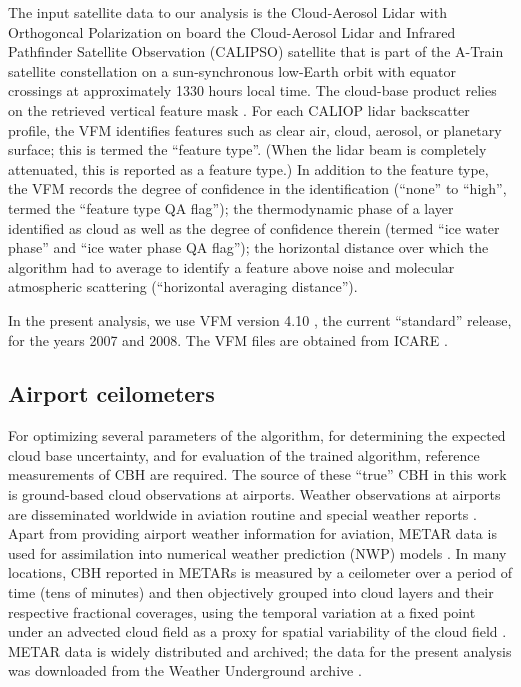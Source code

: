 \documentclass[essd,manuscript]{copernicus}\usepackage[]{graphicx}\usepackage[]{color}
\newcommand{\hlnum}[1]{\textcolor[rgb]{0.686,0.059,0.569}{#1}}%
\newcommand\comment[2]{\{\hlnum{ \textit{#1}: #2}\}}
\newcommand\commentjm[1]{\comment{$j_\mu$}{#1}}
\begin{document}
The input satellite data to our analysis is the Cloud-Aerosol Lidar with
Orthogoncal Polarization \cite[CALIOP][]{Winker2007} on board the Cloud-Aerosol Lidar and Infrared Pathfinder
Satellite Observation (CALIPSO) satellite that is part of the A-Train
satellite constellation \citep{Stephens2002} on a
sun-synchronous low-Earth orbit with equator crossings at approximately 1330 hours local
time. The cloud-base product relies on the retrieved vertical feature mask
\citep[VFM][]{vaughan2002}.  For each CALIOP lidar backscatter profile, the VFM identifies features
such as clear air, cloud, aerosol, or planetary surface; this is termed the ``feature
type''.  (When the lidar beam is completely attenuated, this is reported as a
feature type.)  In addition to the feature type, the VFM records the degree of
confidence in the identification (``none'' to ``high'', termed the ``feature
type QA flag''); the thermodynamic phase of a layer identified as cloud as well
as the degree of confidence therein (termed ``ice water phase'' and ``ice water
phase QA flag''); the horizontal distance over which the algorithm had to
average to identify a feature above noise and molecular atmospheric scattering
(``horizontal averaging distance'').  

In the present analysis, we use VFM version 4.10 \citep{vfm}, the current
``standard'' release, for the years 2007 and 2008.  The VFM files are obtained
from ICARE \citep{icare}.

\subsection{Airport ceilometers}





For optimizing several parameters of the algorithm, for determining the expected
cloud base uncertainty, and for evaluation of the trained algorithm, reference
measurements of CBH are required.  The source of these ``true'' CBH in this work
is ground-based cloud observations at airports.  Weather observations at
airports are disseminated worldwide in aviation routine and special weather
reports \citep[METARs and SPECIs, collectively referred to as METARs
henceforth][]{metar}.  Apart from providing airport weather information for
aviation, METAR data is used for assimilation into numerical weather prediction
(NWP) models \citep[e.g.,][]{Benjamin2016, Dee2011}.  In many locations, CBH
reported in METARs is measured by a ceilometer over a period of time (tens of
minutes) and then objectively grouped into cloud layers and their respective
fractional coverages, using the temporal variation at a fixed point under an
advected cloud field as a proxy for spatial variability of the cloud field
\citep[e.g.,][]{Heese2010}.  METAR data is widely distributed and archived; the
data for the present analysis was downloaded from the Weather Underground
archive \citep{wunderground}.
\end{document}
